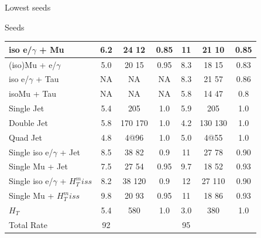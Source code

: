 \documentclass[8pt]{beamer}
\begin{document}
\begin{frame}{Lowest seeds}
\begin{block}{Seeds}
{\begin{tabular}{|l|c|c|c||c|c|c|}
\hline  iso e/$\gamma$ + Mu  &  6.2 &    24   12 & 0.85 &  11   &  21	10 & 0.85 \\ %
\hline  (iso)Mu + e/$\gamma$ &  5.0 &    20   15 & 0.95 &	8.3 &  18	15 & 0.83 \\ %
\hline  iso e/$\gamma$ + Tau &	NA &  	 NA	 &  NA  &	8.3 &  21	57 & 0.86 \\ %
\hline  isoMu + Tau  		  &	NA &  	 NA	 &  NA  &	5.8 &  14	47 & 0.8  \\ %
\hline  Single Jet			  &  5.4 &   205  	 & 1.0  &	5.9 & 205		& 1.0  \\ %
\hline  Double Jet			  &  5.8 &   170  170 & 1.0  &	4.2 & 130  130 & 1.0  \\ %
\hline  Quad Jet  			  &  4.8 &   4@96 	 & 1.0  &	5.0 &  4@55 	& 1.0  \\ %
\hline  Single iso e/$\gamma$ +  Jet  &  8.5 &    38   82 & 0.9  &  11   &  27	78 & 0.90 \\ %
\hline  Single Mu +  Jet	  &  7.5 &    27   54 & 0.95 &	9.7 &  18	52 & 0.93 \\ %
\hline  Single iso e/$\gamma$ + $H_T^miss$&  8.2 &    38  120 & 0.9  &  12   &  27  110 & 0.90 \\ %
\hline  Single Mu + $H_T^miss$   & 9.8  &    20   93 & 0.95 &  11   &  18	86 & 0.93 \\ %
\hline  $H_T$ 				  & 5.4  &    580 	 & 1.0  &	3.0 & 380		& 1.0  \\ %
\hline\hline Total Rate            &  92  &  			 & 	  &	95 	 & 			 &   \\ 
\hline 
\end{tabular}
}
 
\end{block}

\end{frame}
\end{document}
